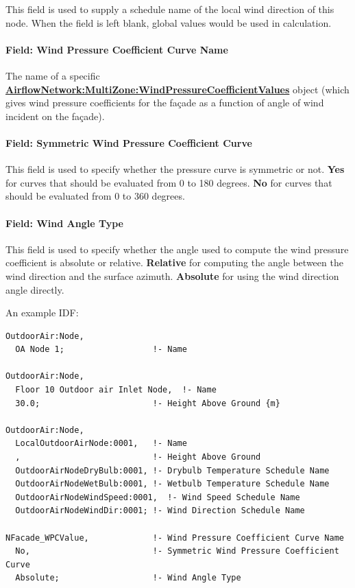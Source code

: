 This field is used to supply a schedule name of the local wind direction of this node. When the field is left blank, global values would be used in calculation.

\paragraph{Field: Wind Pressure Coefficient Curve Name}\label{field-wind-pressure-coeff-curve-name}

The name of a specific \textbf{\hyperref[airflownetworkmultizonewindpressurecoefficientvalues]{AirflowNetwork:MultiZone:WindPressureCoefficientValues}} object (which gives wind pressure coefficients for the façade as a function of angle of wind incident on the façade).

\paragraph{Field: Symmetric Wind Pressure Coefficient Curve}\label{field-sym-windp-curve-name}

This field is used to specify whether the pressure curve is symmetric or not. \textbf{Yes} for curves that should be evaluated from 0 to 180 degrees. \textbf{No} for curves that should be evaluated from 0 to 360 degrees.

\paragraph{Field: Wind Angle Type}

This field is used to specify whether the angle used to compute the wind pressure coefficient is absolute or relative. \textbf{Relative} for computing the angle between the wind direction and the surface azimuth. \textbf{Absolute} for using the wind direction angle directly.

An example IDF:

\begin{lstlisting}
OutdoorAir:Node,
  OA Node 1;                  !- Name

OutdoorAir:Node,
  Floor 10 Outdoor air Inlet Node,  !- Name
  30.0;                       !- Height Above Ground {m}

OutdoorAir:Node,
  LocalOutdoorAirNode:0001,   !- Name
  ,                           !- Height Above Ground
  OutdoorAirNodeDryBulb:0001, !- Drybulb Temperature Schedule Name
  OutdoorAirNodeWetBulb:0001, !- Wetbulb Temperature Schedule Name
  OutdoorAirNodeWindSpeed:0001,  !- Wind Speed Schedule Name
  OutdoorAirNodeWindDir:0001; !- Wind Direction Schedule Name

NFacade_WPCValue,             !- Wind Pressure Coefficient Curve Name
  No,                         !- Symmetric Wind Pressure Coefficient Curve
  Absolute;                   !- Wind Angle Type
\end{lstlisting}

